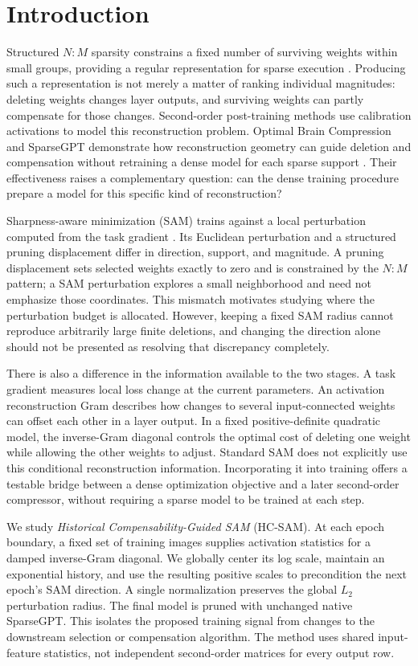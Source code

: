\section{Introduction}
Structured $N{:}M$ sparsity constrains a fixed number of surviving weights within small groups, providing a regular representation for sparse execution \cite{nm}. Producing such a representation is not merely a matter of ranking individual magnitudes: deleting weights changes layer outputs, and surviving weights can partly compensate for those changes. Second-order post-training methods use calibration activations to model this reconstruction problem. Optimal Brain Compression and SparseGPT demonstrate how reconstruction geometry can guide deletion and compensation without retraining a dense model for each sparse support \cite{obc,sparsegpt}. Their effectiveness raises a complementary question: can the dense training procedure prepare a model for this specific kind of reconstruction?

Sharpness-aware minimization (SAM) trains against a local perturbation computed from the task gradient \cite{sam}. Its Euclidean perturbation and a structured pruning displacement differ in direction, support, and magnitude. A pruning displacement sets selected weights exactly to zero and is constrained by the $N{:}M$ pattern; a SAM perturbation explores a small neighborhood and need not emphasize those coordinates. This mismatch motivates studying where the perturbation budget is allocated. However, keeping a fixed SAM radius cannot reproduce arbitrarily large finite deletions, and changing the direction alone should not be presented as resolving that discrepancy completely.

There is also a difference in the information available to the two stages. A task gradient measures local loss change at the current parameters. An activation reconstruction Gram describes how changes to several input-connected weights can offset each other in a layer output. In a fixed positive-definite quadratic model, the inverse-Gram diagonal controls the optimal cost of deleting one weight while allowing the other weights to adjust. Standard SAM does not explicitly use this conditional reconstruction information. Incorporating it into training offers a testable bridge between a dense optimization objective and a later second-order compressor, without requiring a sparse model to be trained at each step.

We study \emph{Historical Compensability-Guided SAM} (HC-SAM). At each epoch boundary, a fixed set of training images supplies activation statistics for a damped inverse-Gram diagonal. We globally center its log scale, maintain an exponential history, and use the resulting positive scales to precondition the next epoch's SAM direction. A single normalization preserves the global $L_2$ perturbation radius. The final model is pruned with unchanged native SparseGPT. This isolates the proposed training signal from changes to the downstream selection or compensation algorithm. The method uses shared input-feature statistics, not independent second-order matrices for every output row.

